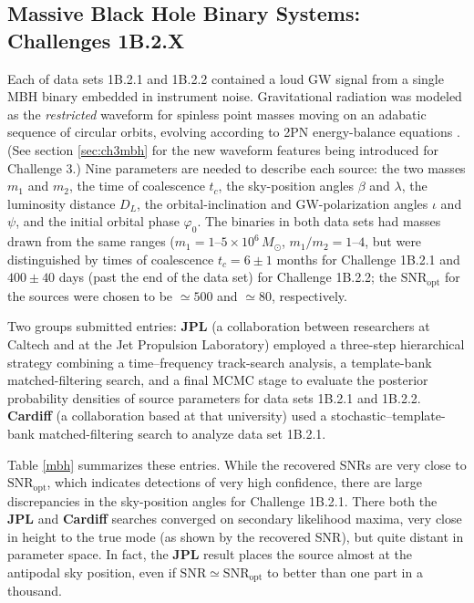 \documentclass{iopart}
\begin{document}
\subsection{Massive Black Hole Binary Systems: Challenges 1B.2.X}

Each of data sets 1B.2.1 and 1B.2.2 contained a loud GW signal from a single MBH binary embedded in instrument noise. Gravitational radiation was modeled as the \emph{restricted} waveform for spinless point masses moving on an adabatic sequence of circular orbits, evolving according to 2PN energy-balance equations \cite[sec.\ 4.4]{mldcgwdaw2}. (See section \ref{sec:ch3mbh} for the new waveform features being introduced for Challenge 3.) Nine parameters are needed to describe each source: the two masses $m_1$ and $m_2$, the time of coalescence $t_c$, the sky-position angles $\beta$ and $\lambda$, the luminosity distance $D_L$, the orbital-inclination and GW-polarization angles $\iota$ and $\psi$, and the initial orbital phase $\varphi_0$. 
The binaries in both data sets had masses drawn from the same ranges ($m_1 = 1\mbox{--}5 \times 10^6\,M_{\odot}$, $m_1/m_2 = 1\mbox{--}4$, but were distinguished by times of coalescence $t_c = 6\pm 1$ months for Challenge 1B.2.1 and $400 \pm 40$ days (past the end of the data set) for Challenge 1B.2.2; the $\mathrm{SNR}_\mathrm{opt}$ for the sources were chosen to be $\simeq 500$ and $\simeq 80$, respectively.

Two groups submitted entries: \textbf{JPL} (a collaboration between researchers at Caltech and at the Jet Propulsion Laboratory) employed a three-step hierarchical strategy combining a time--frequency track-search analysis, a template-bank matched-filtering search, and a final MCMC stage to evaluate the posterior probability densities of source parameters for data sets 1B.2.1 and 1B.2.2. \textbf{Cardiff} (a collaboration based at that university) used a stochastic--template-bank matched-filtering search \cite{cardiffmbh} to analyze data set 1B.2.1.

Table \ref{mbh} summarizes these entries. While the recovered SNRs are very close to $\mathrm{SNR}_\mathrm{opt}$, which indicates detections of very high confidence, there are large discrepancies in the sky-position angles for Challenge 1B.2.1. There both the \textbf{JPL} and \textbf{Cardiff} searches converged on secondary likelihood maxima, very close in height to the true mode (as shown by the recovered SNR), but quite distant in parameter space.
In fact, the \textbf{JPL} result places the source almost at the antipodal sky position, even if $\mathrm{SNR} \simeq \mathrm{SNR}_\mathrm{opt}$ to better than one part in a thousand.
\end{document}
